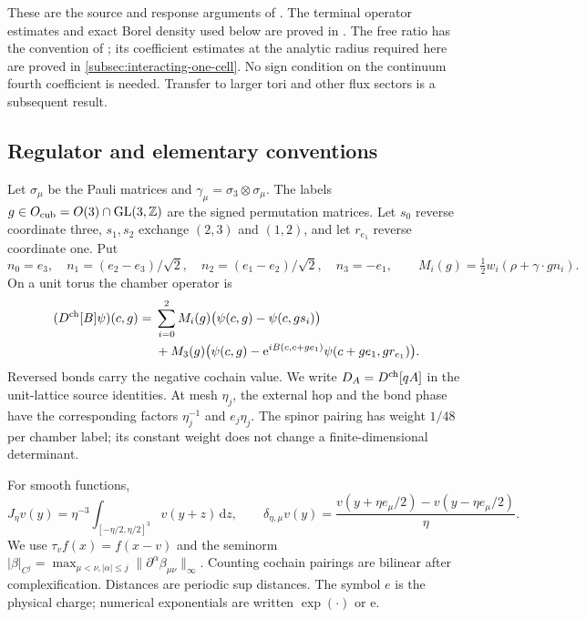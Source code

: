 \documentclass[11pt,letterpaper,reqno]{amsart}
\newcommand{\Z}{\mathbb Z}
\newcommand{\dd}{\mathrm d}
\begin{document}
These are the source and response arguments of
\cite[\S19--20, \S21.1, \S23]{QED3Master}.
The terminal operator estimates and exact Borel density used below are
proved in \cite[Theorem~B, \S6 and Appendix~A]{TerminalPressure}.
The free ratio has the convention of
\cite[Theorem~B]{PositiveProbe}; its coefficient estimates at the
analytic radius required here are proved in \cref{subsec:interacting-one-cell}.
No sign condition on the continuum fourth coefficient is needed.
Transfer to larger tori and other flux sectors is a subsequent result.

\subsection{Regulator and elementary conventions}\label{subsec:rrm-regulator}
Let $\sigma_\mu$ be the Pauli matrices and
$\gamma_\mu=\sigma_3\otimes\sigma_\mu$.
The labels $g\in O_{\rm cub}=O(3)\cap\mathrm{GL}(3,\Z)$ are
the signed permutation matrices. Let $s_0$ reverse coordinate three,
$s_1,s_2$ exchange $(2,3)$ and $(1,2)$, and let $r_{e_1}$ reverse
coordinate one. Put
\[
 n_0=e_3,\quad n_1=(e_2-e_3)/\sqrt2,\quad
 n_2=(e_1-e_2)/\sqrt2,\quad n_3=-e_1,\qquad
 M_i(g)=\tfrac12w_i(\rho+\gamma\cdot gn_i).
\]
On a unit torus the chamber operator is
\begin{equation}\label{eq:rrm-regulator}
 \begin{split}
 (D^{\rm ch}[B]\psi)(c,g)={}&
 \sum_{i=0}^2M_i(g)\bigl(\psi(c,g)-\psi(c,gs_i)\bigr)\\
 &+M_3(g)\bigl(\psi(c,g)
       -\mathrm e^{iB(c,c+ge_1)}\psi(c+ge_1,gr_{e_1})\bigr).
 \end{split}
\end{equation}
Reversed bonds carry the negative cochain value.
We write $D_A=D^{\rm ch}[qA]$ in the unit-lattice source identities.
At mesh $\eta_j$, the external hop and the bond phase have the
corresponding factors $\eta_j^{-1}$ and $e_j\eta_j$.
The spinor pairing has weight $1/48$ per chamber label; its constant
weight does not change a finite-dimensional determinant.

For smooth functions,
\[
 J_\eta v(y)=\eta^{-3}\int_{[-\eta/2,\eta/2]^3}v(y+z)\,\dd z,
 \qquad
 \delta_{\eta,\mu}v(y)=
 \frac{v(y+\eta e_\mu/2)-v(y-\eta e_\mu/2)}{\eta}.
\]
We use $\tau_vf(x)=f(x-v)$ and the seminorm
$|\beta|_{C^j}=\max_{\mu<\nu,|\alpha|\le j}
\|\partial^\alpha\beta_{\mu\nu}\|_\infty$.
Counting cochain pairings are bilinear after complexification.
Distances are periodic sup distances. The symbol $e$ is the physical
charge; numerical exponentials are written $\exp(\cdot)$ or $\mathrm e$.
\end{document}
